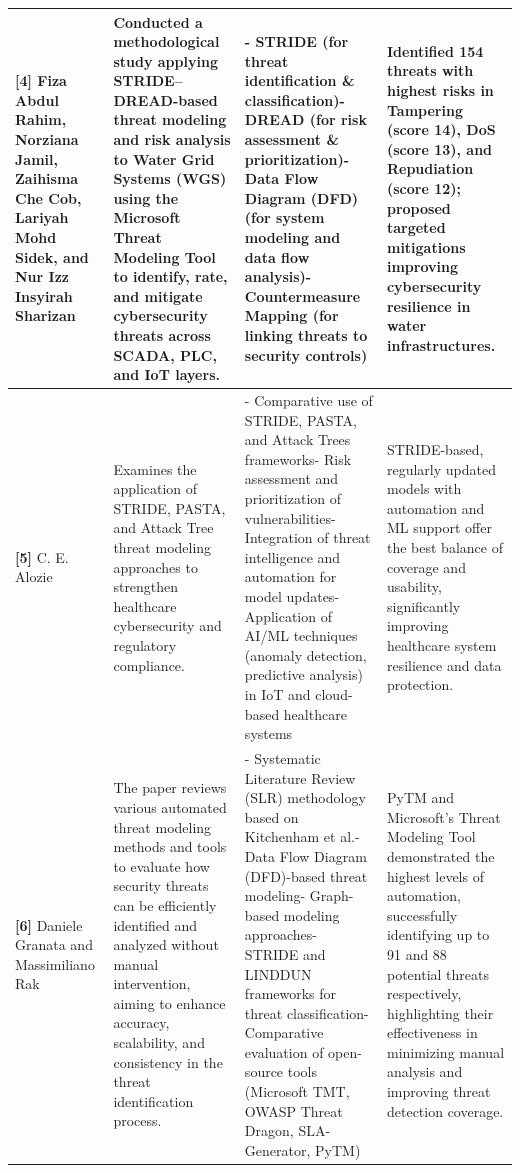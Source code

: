 \begin{scriptsize}
\begin{longtable}{|p{1.8cm}|p{4.2cm}|p{4.0cm}|p{3.8cm}|}
\textbf{[4]} Fiza Abdul Rahim, Norziana Jamil, Zaihisma Che Cob, Lariyah Mohd Sidek, and Nur Izz Insyirah Sharizan & Conducted a methodological study applying STRIDE--DREAD-based threat modeling and risk analysis to Water Grid Systems (WGS) using the Microsoft Threat Modeling Tool to identify, rate, and mitigate cybersecurity threats across SCADA, PLC, and IoT layers. & - STRIDE (for threat identification \& classification)\newline - DREAD (for risk assessment \& prioritization)\newline - Data Flow Diagram (DFD) (for system modeling and data flow analysis)\newline - Countermeasure Mapping (for linking threats to security controls) & Identified 154 threats with highest risks in Tampering (score 14), DoS (score 13), and Repudiation (score 12); proposed targeted mitigations improving cybersecurity resilience in water infrastructures. \\
\hline
\textbf{[5]} C. E. Alozie & Examines the application of STRIDE, PASTA, and Attack Tree threat modeling approaches to strengthen healthcare cybersecurity and regulatory compliance. & - Comparative use of STRIDE, PASTA, and Attack Trees frameworks\newline - Risk assessment and prioritization of vulnerabilities\newline - Integration of threat intelligence and automation for model updates\newline - Application of AI/ML techniques (anomaly detection, predictive analysis) in IoT and cloud-based healthcare systems & STRIDE-based, regularly updated models with automation and ML support offer the best balance of coverage and usability, significantly improving healthcare system resilience and data protection. \\
\hline
\textbf{[6]} Daniele Granata and Massimiliano Rak & The paper reviews various automated threat modeling methods and tools to evaluate how security threats can be efficiently identified and analyzed without manual intervention, aiming to enhance accuracy, scalability, and consistency in the threat identification process. & - Systematic Literature Review (SLR) methodology based on Kitchenham et al.\newline - Data Flow Diagram (DFD)-based threat modeling\newline - Graph-based modeling approaches\newline - STRIDE and LINDDUN frameworks for threat classification\newline - Comparative evaluation of open-source tools (Microsoft TMT, OWASP Threat Dragon, SLA-Generator, PyTM) & PyTM and Microsoft's Threat Modeling Tool demonstrated the highest levels of automation, successfully identifying up to 91 and 88 potential threats respectively, highlighting their effectiveness in minimizing manual analysis and improving threat detection coverage. \\

\end{longtable}
\end{scriptsize}
